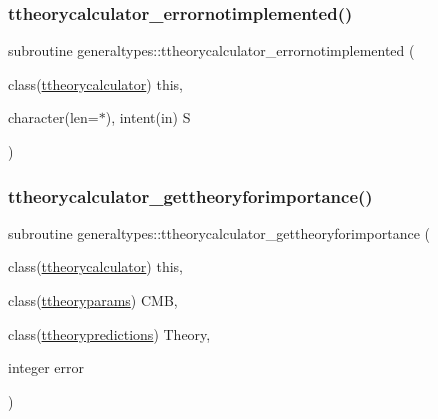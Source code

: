 \mbox{\label{namespacegeneraltypes_af10543377b813170c5ba69fe2ebfdd44}} 
\subsubsection{\texorpdfstring{ttheorycalculator\+\_\+errornotimplemented()}{ttheorycalculator\_errornotimplemented()}}
{\footnotesize\ttfamily subroutine generaltypes\+::ttheorycalculator\+\_\+errornotimplemented (\begin{DoxyParamCaption}\item[{class(\mbox{\hyperlink{structgeneraltypes_1_1ttheorycalculator}{ttheorycalculator}})}]{this,  }\item[{character(len=$\ast$), intent(in)}]{S }\end{DoxyParamCaption})\hspace{0.3cm}{\ttfamily [private]}}

\mbox{\label{namespacegeneraltypes_a46caf82f82aed371c7f69a0168e9167b}} 
\subsubsection{\texorpdfstring{ttheorycalculator\+\_\+gettheoryforimportance()}{ttheorycalculator\_gettheoryforimportance()}}
{\footnotesize\ttfamily subroutine generaltypes\+::ttheorycalculator\+\_\+gettheoryforimportance (\begin{DoxyParamCaption}\item[{class(\mbox{\hyperlink{structgeneraltypes_1_1ttheorycalculator}{ttheorycalculator}})}]{this,  }\item[{class(\mbox{\hyperlink{structgeneraltypes_1_1ttheoryparams}{ttheoryparams}})}]{C\+MB,  }\item[{class(\mbox{\hyperlink{structgeneraltypes_1_1ttheorypredictions}{ttheorypredictions}})}]{Theory,  }\item[{integer}]{error }\end{DoxyParamCaption})\hspace{0.3cm}{\ttfamily [private]}}

